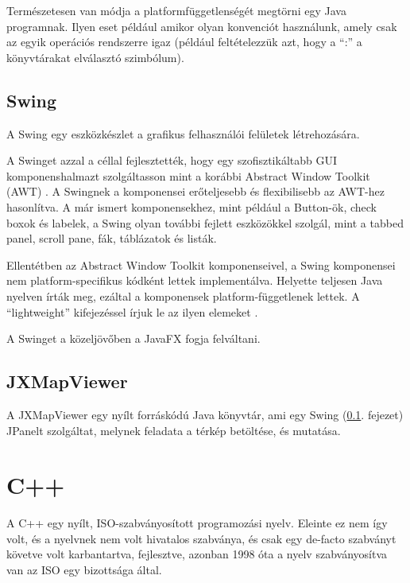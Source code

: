 \documentclass[a4paper,12pt]{report}
\begin{document}
\vspace{2mm}
Természetesen van módja a platformfüggetlenségét megtörni egy Java programnak. Ilyen eset például amikor olyan konvenciót használunk, amely csak az egyik operációs rendszerre igaz (például feltételezzük azt, hogy a ``:'' a könyvtárakat elválasztó szimbólum).

\subsection{Swing}
\label{swing}

A Swing egy eszközkészlet a grafikus felhasználói felületek létrehozására.

\vspace{2mm}
A Swinget azzal a céllal fejlesztették, hogy egy szofisztikáltabb GUI komponenshalmazt szolgáltasson mint a korábbi Abstract Window Toolkit (AWT) \cite{awt}. A Swingnek a komponensei erőteljesebb és flexibilisebb az AWT-hez hasonlítva. A már ismert komponensekhez, mint például a Button-ök, check boxok és labelek, a Swing olyan további fejlett eszközökkel szolgál, mint a tabbed panel, scroll pane, fák, táblázatok és listák.

\vspace{2mm}
Ellentétben az Abstract Window Toolkit komponenseivel, a Swing komponensei nem platform-specifikus kódként lettek implementálva. Helyette teljesen Java nyelven írták meg, ezáltal a komponensek platform-függetlenek lettek. A ``lightweight'' kifejezéssel írjuk le az ilyen elemeket \cite{swingarticle}.

\vspace{2mm}
A Swinget a közeljövőben a JavaFX \cite{javafx} fogja felváltani.

\subsection{JXMapViewer}
\label{jxmapviewer}

A JXMapViewer \cite{jxmapv} egy nyílt forráskódú Java könyvtár, ami egy Swing (\ref{swing}. fejezet) JPanelt \cite{jpanel} szolgáltat, melynek feladata a térkép betöltése, és mutatása.

\newpage
\section{C++}
\label{cplusplus}

A C++ egy nyílt, ISO-szabványosított programozási nyelv. Eleinte ez nem így volt, és a nyelvnek nem volt hivatalos szabványa, és csak egy de-facto szabványt követve volt karbantartva, fejlesztve, azonban 1998 óta \cite{c++98} a nyelv szabványosítva van az ISO egy bizottsága által.
\end{document}
